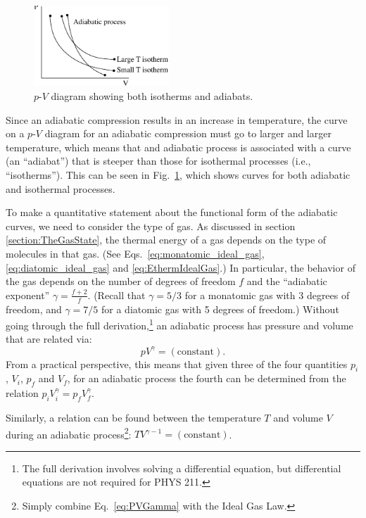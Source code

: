 \begin{figure}
\begin{center}
\includegraphics[width=2.0in]{gas_processes/IsothermAdiabats.eps}
\caption{$p$-$V$ diagram showing both isotherms and adiabats.}
\label{fig:IsothermAdiabats}
\end{center}
\end{figure}

Since an adiabatic compression results in an increase in temperature,
the curve on a $p$-$V$ diagram for an adiabatic compression must go to larger
and larger temperature, which means that and adiabatic process is
associated with a curve (an ``adiabat'') that is steeper than those for
isothermal processes (i.e., ``isotherms''). This can be seen in 
Fig.~\ref{fig:IsothermAdiabats},
 which shows curves for both adiabatic and isothermal processes.

To make a quantitative statement about the functional form of the
adiabatic curves, we need to consider the type of gas. 
As discussed in section \ref{section:TheGasState}, the thermal energy
of a gas depends on the type of molecules in that gas.  (See 
Eqs.~\ref{eq:monatomic_ideal_gas}, \ref{eq:diatomic_ideal_gas} and 
\ref{eq:EthermIdealGas}.) In particular, the behavior of the gas depends
on the number of degrees of freedom $f$ and the ``adiabatic exponent''
$\gamma = \frac{f+2}{f}$. (Recall that $\gamma = 5/3$ for a monatomic
gas with 3 degrees of freedom, and $\gamma = 7/5$ for a diatomic
gas with 5 degrees of freedom.) Without going through the full 
derivation,\footnote{The full derivation involves solving 
a differential equation, but differential equations are not required for 
PHYS 211.} an adiabatic process has pressure and volume that are
related via:
\begin{equation}
pV^{\gamma} = (\text{constant}).
\label{eq:PVGamma}
\end{equation}
From a practical perspective, this means that given three of the four quantities
$p_i$, $V_i$, $p_f$ and $V_f$, for an adiabatic process the fourth can be determined from the relation
$p_iV_i^{\gamma} = p_fV_f^{\gamma}$.

Similarly, a relation can be found between the temperature $T$ and volume $V$
during an adiabatic process\footnote{Simply combine Eq.~\ref{eq:PVGamma} with
the Ideal Gas Law.}: $TV^{\gamma - 1} = (\text{constant})$.

